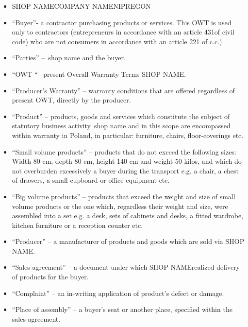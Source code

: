 \documentclass[10pt,a4paper]{article}
\newcommand{\shopname}{SHOP NAME}
\newcommand{\companyname}{COMPANY NAME}
\newcommand{\regon}{REGON}
\newcommand{\nip}{NIP}
\begin{document}
\begin{itemize}

\item \shopname \companyname \nip \regon
	
\item “Buyer”- a contractor purchasing products or services. This OWT is used only to contractors (entrepreneurs in accordance with an article 431of civil code) who are not consumers in accordance with an article 221 of c.c.) 

\item “Parties” –\ shop name and the buyer.

\item “OWT “– present Overall Warranty Terms \shopname. 

\item “Producer’s Warranty” – warranty conditions that are offered regardless of  present OWT, directly by the producer.

\item “Product” – products, goods and services which constitute the subject of statutory business activity\ shop name and in this scope are encompassed within warranty in Poland, in particular: furniture, chairs, floor-coverings etc. 

\item “Small volume products” – products that do not exceed the following sizes: 
Width 80 cm, depth 80 cm, height 140 cm and weight 50 kilos, and which do not overburden excessively a buyer during the transport e.g. a chair, a chest of drawers, a small cupboard or office equipment etc.

\item “Big volume products” – products that exceed the weight and size of small volume products or the one which, regardless their weight and size, were assembled into a set e.g. a desk, sets of cabinets and desks, a fitted wardrobe, kitchen furniture or a reception counter etc.

\item “Producer” – a manufacturer of products and goods which are sold via \shopname.

\item “Sales agreement” – a document under which \shopname realized delivery of products for the buyer.

\item “Complaint” – an in-writing application of product’s defect or damage.

\item“Place of assembly” – a buyer’s seat or another place, specified within the sales agreement.

\end{itemize}
\end{document}
